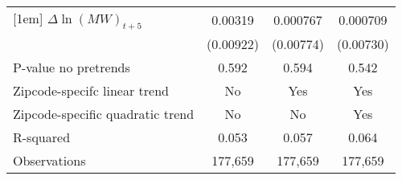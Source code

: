 {\begin{tabular}{l*{3}{c}}
[1em]
$\Delta \ln(MW)_{t+5}$&  0.00319         & 0.000767         & 0.000709         \\
          &(0.00922)         &(0.00774)         &(0.00730)         \\
\hline
P-value no pretrends&    0.592         &    0.594         &    0.542         \\
Zipcode-specifc linear trend&       No         &      Yes         &      Yes         \\
Zipcode-specific quadratic trend&       No         &       No         &      Yes         \\
R-squared &    0.053         &    0.057         &    0.064         \\
Observations&  177,659         &  177,659         &  177,659         \\
\hline\hline
\end{tabular}
}
